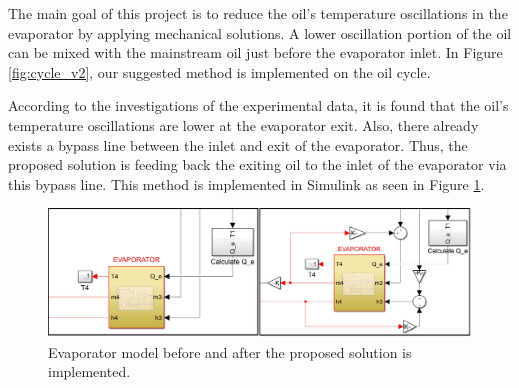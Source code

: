 The main goal of this project is to reduce the oil's temperature oscillations in the evaporator by applying mechanical solutions. A lower oscillation portion of the oil can be mixed with the mainstream oil just before the evaporator inlet. In Figure \ref{fig:cycle_v2}, our suggested method is implemented on the oil cycle.


According to the investigations of the experimental data, it is found that the oil's temperature oscillations are lower at the evaporator exit. Also, there already exists a bypass line between the inlet and exit of the evaporator. Thus, the proposed solution is feeding back the exiting oil to the inlet of the evaporator via this bypass line. This method is implemented in Simulink as seen in Figure \ref{fig:oldandnew}.

\bigskip

\begin{figure}[H]
    \centering
    \includegraphics[width=14cm]{images/oldandnew.png}
    \caption{Evaporator model before and after the proposed solution is implemented.}
    \label{fig:oldandnew}
\end{figure}